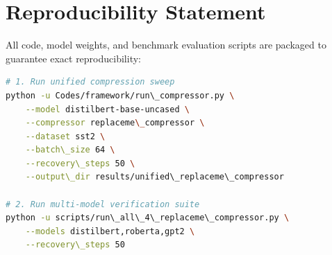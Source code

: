 \section{Reproducibility Statement}
All code, model weights, and benchmark evaluation scripts are packaged to guarantee exact reproducibility:
\begin{lstlisting}[language=bash]
# 1. Run unified compression sweep
python -u Codes/framework/run\_compressor.py \
    --model distilbert-base-uncased \
    --compressor replaceme\_compressor \
    --dataset sst2 \
    --batch\_size 64 \
    --recovery\_steps 50 \
    --output\_dir results/unified\_replaceme\_compressor

# 2. Run multi-model verification suite
python -u scripts/run\_all\_4\_replaceme\_compressor.py \
    --models distilbert,roberta,gpt2 \
    --recovery\_steps 50
\end{lstlisting}
